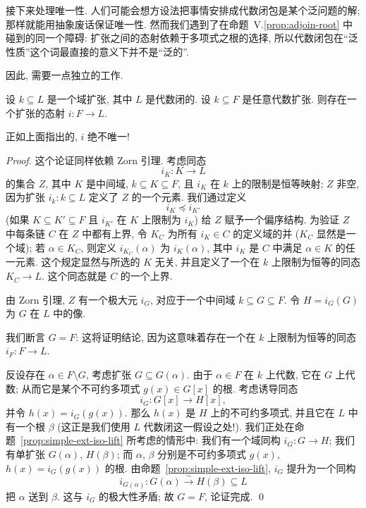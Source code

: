 接下来处理唯一性. 人们可能会想方设法把事情安排成代数闭包是某个泛问题的解; 那样就能用抽象废话保证唯一性. 然而我们遇到了在命题~V.\ref{prop:adjoin-root} 中碰到的同一个障碍: 扩张之间的态射依赖于多项式之根的选择, 所以代数闭包在``泛性质''这个词最直接的意义下并不是``泛的''.

因此, 需要一点独立的工作.

\begin{lemma}\label{lem:embed-algebraic-ext}
设 $k\subseteq L$ 是一个域扩张, 其中 $L$ 是代数闭的. 设 $k\subseteq F$ 是任意代数扩张. 则存在一个扩张的态射 $i:F\to L$.
\end{lemma}

正如上面指出的, $i$ 绝不唯一!

\begin{proof}
这个论证同样依赖 Zorn 引理. 考虑同态
\[
i_K:K\to L
\]
的集合 $Z$, 其中 $K$ 是中间域, $k\subseteq K\subseteq F$, 且 $i_K$ 在 $k$ 上的限制是恒等映射; $Z$ 非空, 因为扩张 $i_k:k\subseteq L$ 定义了 $Z$ 的一个元素. 我们通过定义
\[
i_K\preceq i_{K'}
\]
(如果 $K\subseteq K'\subseteq F$ 且 $i_{K'}$ 在 $K$ 上限制为 $i_K$) 给 $Z$ 赋予一个偏序结构. 为验证 $Z$ 中每条链 $C$ 在 $Z$ 中都有上界, 令 $K_C$ 为所有 $i_K\in C$ 的定义域的并 ($K_C$ 显然是一个域); 若 $\alpha\in K_C$, 则定义 $i_{K_C}(\alpha)$ 为 $i_K(\alpha)$, 其中 $i_K$ 是 $C$ 中满足 $\alpha\in K$ 的任一元素. 这个规定显然与所选的 $K$ 无关, 并且定义了一个在 $k$ 上限制为恒等的同态 $K_C\to L$. 这个同态就是 $C$ 的一个上界.

由 Zorn 引理, $Z$ 有一个极大元 $i_G$, 对应于一个中间域 $k\subseteq G\subseteq F$. 令 $H=i_G(G)$ 为 $G$ 在 $L$ 中的像.

我们断言 $G=F$: 这将证明结论, 因为这意味着存在一个在 $k$ 上限制为恒等的同态 $i_F:F\to L$.

反设存在 $\alpha\in F\setminus G$, 考虑扩张 $G\subseteq G(\alpha)$. 由于 $\alpha\in F$ 在 $k$ 上代数, 它在 $G$ 上代数; 从而它是某个不可约多项式 $g(x)\in G[x]$ 的根. 考虑诱导同态
\[
i_G:G[x]\to H[x],
\]
并令 $h(x)=i_G(g(x))$. 那么 $h(x)$ 是 $H$ 上的不可约多项式, 并且它在 $L$ 中有一个根 $\beta$ (这正是我们使用 $L$ 代数闭这一假设之处!). 我们正处在命题~\ref{prop:simple-ext-iso-lift} 所考虑的情形中: 我们有一个域同构 $i_G:G\to H$; 我们有单扩张 $G(\alpha)$, $H(\beta)$; 而 $\alpha$, $\beta$ 分别是不可约多项式 $g(x)$, $h(x)=i_G(g(x))$ 的根. 由命题~\ref{prop:simple-ext-iso-lift}, $i_G$ 提升为一个同构
\[
i_{G(\alpha)}:G(\alpha)\xrightarrow{\sim}H(\beta)\subseteq L
\]
把 $\alpha$ 送到 $\beta$. 这与 $i_G$ 的极大性矛盾; 故 $G=F$, 论证完成. \qed
\end{proof}

